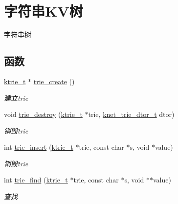 \hypertarget{a00123}{}\section{字符串\+K\+V树}
\label{a00123}


字符串树  


\subsection*{函数}
\begin{DoxyCompactItemize}
\item 
\hyperlink{a00056_a6b38314f31c4ed3eb36896383425a381_a6b38314f31c4ed3eb36896383425a381}{ktrie\+\_\+t} $\ast$ \hyperlink{a00123_ga40c34f3f3eed953a77e3df2927a24d0c_ga40c34f3f3eed953a77e3df2927a24d0c}{trie\+\_\+create} ()
\begin{DoxyCompactList}\small\item\em 建立trie \end{DoxyCompactList}\item 
void \hyperlink{a00123_ga1d3fcf14bbc77f4b3221ddb1121c21a0_ga1d3fcf14bbc77f4b3221ddb1121c21a0}{trie\+\_\+destroy} (\hyperlink{a00056_a6b38314f31c4ed3eb36896383425a381_a6b38314f31c4ed3eb36896383425a381}{ktrie\+\_\+t} $\ast$trie, \hyperlink{a00056_a46741b0dab7bbb26d611c429ee64d78c_a46741b0dab7bbb26d611c429ee64d78c}{knet\+\_\+trie\+\_\+dtor\+\_\+t} dtor)
\begin{DoxyCompactList}\small\item\em 销毁trie \end{DoxyCompactList}\item 
int \hyperlink{a00123_ga05e43d257d3626377de3340b6cd542fa_ga05e43d257d3626377de3340b6cd542fa}{trie\+\_\+insert} (\hyperlink{a00056_a6b38314f31c4ed3eb36896383425a381_a6b38314f31c4ed3eb36896383425a381}{ktrie\+\_\+t} $\ast$trie, const char $\ast$s, void $\ast$value)
\begin{DoxyCompactList}\small\item\em 销毁trie \end{DoxyCompactList}\item 
int \hyperlink{a00123_gae9c0f01c6b0eaf828710de2999601a11_gae9c0f01c6b0eaf828710de2999601a11}{trie\+\_\+find} (\hyperlink{a00056_a6b38314f31c4ed3eb36896383425a381_a6b38314f31c4ed3eb36896383425a381}{ktrie\+\_\+t} $\ast$trie, const char $\ast$s, void $\ast$$\ast$value)
\begin{DoxyCompactList}\small\item\em 查找 \end{DoxyCompactList}\item 
$$
\end{DoxyCompactItemize}
